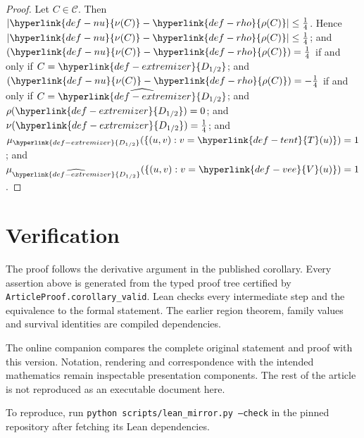 \documentclass[11pt]{article}
\begin{document}
\begin{proof}
Let $C\in \mathcal{C}$.
Then $\left|\hyperlink{def-nu}{\nu(C)} - \hyperlink{def-rho}{\rho(C)}\right| \le \frac{1}{4}$.
Hence $\left|\hyperlink{def-nu}{\nu(C)} - \hyperlink{def-rho}{\rho(C)}\right| \le \frac{1}{4}$; and $\left(\hyperlink{def-nu}{\nu(C)} - \hyperlink{def-rho}{\rho(C)}\right) = \frac{1}{4}$ if and only if $C = \hyperlink{def-extremizer}{D_{1/2}}$; and $\left(\hyperlink{def-nu}{\nu(C)} - \hyperlink{def-rho}{\rho(C)}\right) = -\frac{1}{4}$ if and only if $C = \widehat{\hyperlink{def-extremizer}{D_{1/2}}}$; and $\rho(\hyperlink{def-extremizer}{D_{1/2}}) = 0$; and $\nu(\hyperlink{def-extremizer}{D_{1/2}}) = \frac{1}{4}$; and $\mu_{\hyperlink{def-extremizer}{D_{1/2}}}(\{(u,v):v=\hyperlink{def-tent}{T}(u)\})=1$; and $\mu_{\widehat{\hyperlink{def-extremizer}{D_{1/2}}}}(\{(u,v):v=\hyperlink{def-vee}{V}(u)\})=1$.
\end{proof}
\section*{Verification}
The proof follows the derivative argument in the published corollary. Every assertion above is generated from the typed proof tree certified by \texttt{ArticleProof.corollary\_valid}. Lean checks every intermediate step and the equivalence to the formal statement. The earlier region theorem, family values and survival identities are compiled dependencies.

The online companion compares the complete original statement and proof with this version. Notation, rendering and correspondence with the intended mathematics remain inspectable presentation components. The rest of the article is not reproduced as an executable document here.

To reproduce, run \texttt{python scripts/lean\_mirror.py --check} in the pinned repository after fetching its Lean dependencies.
\end{document}
